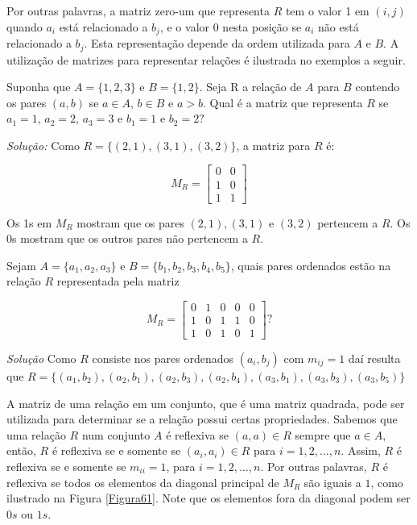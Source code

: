 Por outras palavras, a matriz zero-um que representa $R$ tem o valor 1 em
$(i,j)$ quando $a_i$ está relacionado a $b_j$, e o valor 0 nesta posição se
$a_i$ não está relacionado a $b_j$. Esta representação depende da ordem
utilizada para $A$ e $B$. A utilização de matrizes para representar relações é
ilustrada no exemplos a seguir.

\begin{description}
	\item[Exemplo \ref{exe610}] {Suponha que $A = \{1,2,3\}$ e $B = \{1,2\}$. Seja
	R a relação de $A$ para $B$ contendo os pares $(a,b)$ se $a \in A$, $b \in B$
	e $a > b$. Qual é a matriz que representa $R$ se $a_1 = 1$, $a_2 = 2$, $a_3 =
	3$ e $b_1 = 1$ e $b_2 = 2?$}
\end{description}

\emph{Solução:} Como $R = \{(2, 1), (3, 1), (3, 2)\}$, a matriz para $R$ é:

\[
M_R = \begin{bmatrix}
	0 & 0\\
	1 & 0\\
	1 & 1
\end{bmatrix}
\]

Os 1s em $M_R$ mostram que os pares $(2,1), (3,1)$ e $(3,2)$ pertencem a $R$. Os 0s mostram que os outros pares não
pertencem a $R$.

\begin{description}
	\item[Exemplo \ref{exe611}]{Sejam $A = \{a_1, a_2, a_3\}$ e $B = \{b_1, b_2,
	b_3, b_4, b_5\}$, quais pares ordenados estão na relação $R$ representada pela
	matriz}
\end{description}

\[
	M_R = \begin{bmatrix}
	0 & 1 & 0 & 0 & 0\\
	1 & 0 & 1 & 1 & 0\\
	1 & 0 & 1 & 0 & 1
	\end{bmatrix}?
\]
	
\emph{Solução} Como $R$ consiste nos pares ordenados $(a_i, b_j)$ com $m_{ij} =
1$ daí resulta que $R = \{(a_1,b_2), (a_2,b_1), (a_2, b_3), (a_2, b_4), (a_3,
b_1), (a_3, b_3), (a_3, b_5)\}$

A matriz de uma relação em um conjunto, que é uma matriz quadrada, pode ser
utilizada para determinar se a relação possui certas propriedades. Sabemos que
uma relação $R$ num conjunto $A$ é reflexiva se $(a,a) \in R$ sempre que $a \in
A$, então, $R$ é reflexiva se e somente se $(a_i, a_i) \in R$ para $i =
1,2,\ldots,n$. Assim, $R$ é reflexiva se e somente se $m_{ii} = 1$, para $i =
1,2,\ldots,n$. Por outras palavras, $R$ é reflexiva se todos os elementos da
diagonal principal de $M_R$ são iguais a $1$, como ilustrado na Figura
\ref{Figura61}. Note que os elementos fora da diagonal podem ser $0s$ ou $1s$.

